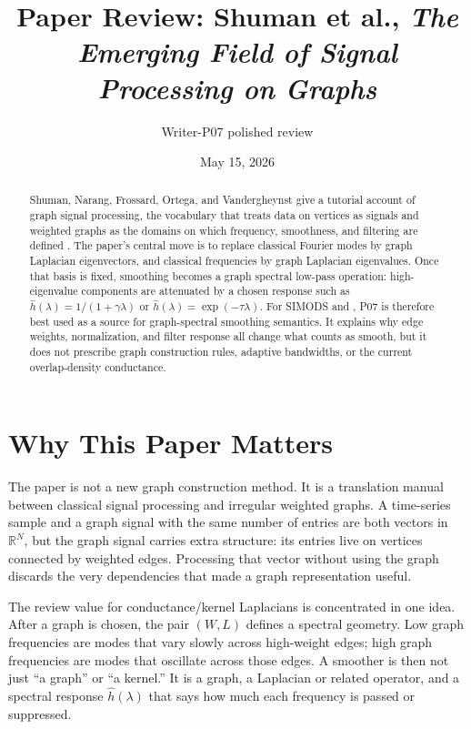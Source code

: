 \documentclass[11pt]{article}
\title{Paper Review: Shuman et al., \emph{The Emerging Field of Signal Processing on Graphs}}
\author{Writer-P07 polished review}
\date{May 15, 2026}
\begin{document}
\maketitle

\begin{abstract}
Shuman, Narang, Frossard, Ortega, and Vandergheynst give a tutorial account of
graph signal processing, the vocabulary that treats data on vertices as
signals and weighted graphs as the domains on which frequency, smoothness, and
filtering are defined \citep{shuman2013emerging}.  The paper's central move is
to replace classical Fourier modes by graph Laplacian eigenvectors, and
classical frequencies by graph Laplacian eigenvalues.  Once that basis is
fixed, smoothing becomes a graph spectral low-pass operation: high-eigenvalue
components are attenuated by a chosen response such as
$\hat h(\lambda)=1/(1+\gamma\lambda)$ or $\hat h(\lambda)=\exp(-\tau\lambda)$.
For SIMODS and , P07 is therefore best used as a source for
graph-spectral smoothing semantics.  It explains why edge weights,
normalization, and filter response all change what counts as smooth, but it
does not prescribe graph construction rules, adaptive bandwidths, or the
current  overlap-density conductance.
\end{abstract}

\section{Why This Paper Matters}

The paper is not a new graph construction method.  It is a translation manual
between classical signal processing and irregular weighted graphs.  A
time-series sample and a graph signal with the same number of entries are both
vectors in $\mathbb{R}^N$, but the graph signal carries extra structure: its
entries live on vertices connected by weighted edges.  Processing that vector
without using the graph discards the very dependencies that made a graph
representation useful.

The review value for conductance/kernel Laplacians is concentrated in one
idea.  After a graph is chosen, the pair $(W,L)$ defines a spectral geometry.
Low graph frequencies are modes that vary slowly across high-weight edges;
high graph frequencies are modes that oscillate across those edges.  A
smoother is then not just ``a graph'' or ``a kernel.''  It is a graph, a
Laplacian or related operator, and a spectral response $\hat h(\lambda)$ that
says how much each frequency is passed or suppressed.
\end{document}
